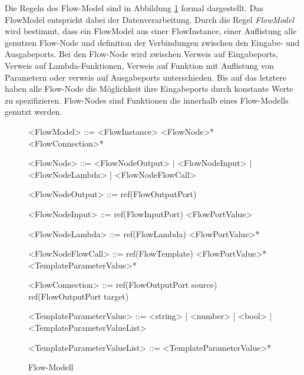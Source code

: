 \documentclass{article}
\begin{document}
    Die Regeln des Flow-Model sind in Abbildung \ref{Flow-Modell} formal dargestellt. Das FlowModel entspricht dabei der Datenverarbeitung. \cite{99}
    Durch die Regel \textit{FlowModel} wird bestimmt, dass ein FlowModel aus einer FlowInstance, einer Auflistung alle genutzen Flow-Node und definition der Verbindungen zwischen den Eingabe- und Ausgabeports.
    Bei den Flow-Node wird zwischen Verweis auf Eingabeports, Verweis auf Lambda-Funktionen, Verweis auf Funktion mit Auflistung von Parametern oder verweis auf Ausgabeports unterschieden.
    Bis auf das letztere haben alle Flow-Node die Möglichkeit ihre Eingabeports durch konstante Werte zu spezifizieren.
    Flow-Nodes sind Funktionen die innerhalb eines Flow-Modells genutzt werden.\\
    \begin{figure}[H]
        \begin{grammar}
            <FlowModel> ::= <FlowInstance> <FlowNode>* <FlowConnection>*

            <FlowNode> ::= <FlowNodeOutput> | <FlowNodeInput> | <FlowNodeLambda> | <FlowNodeFlowCall>
        
            <FlowNodeOutput> ::= ref(FlowOutputPort)

            <FlowNodeInput> ::= ref(FlowInputPort) <FlowPortValue>

            <FlowNodeLambda> ::= ref(FlowLambda) <FlowPortValue>*

            <FlowNodeFlowCall> ::= ref(FlowTemplate) <FlowPortValue>* <TemplateParameterValue>*
        
            <FlowConnection> ::= ref(FlowOutputPort source) ref(FlowOutputPort target)
        
            <TemplateParameterValue> ::= <string> | <number> | <bool> | <TemplateParameterValueList>
        
            <TemplateParameterValueList> ::= <TemplateParameterValue>*
        \end{grammar}
        \caption{Flow-Modell}
        \label{Flow-Modell}
    \end{figure}
\end{document}
